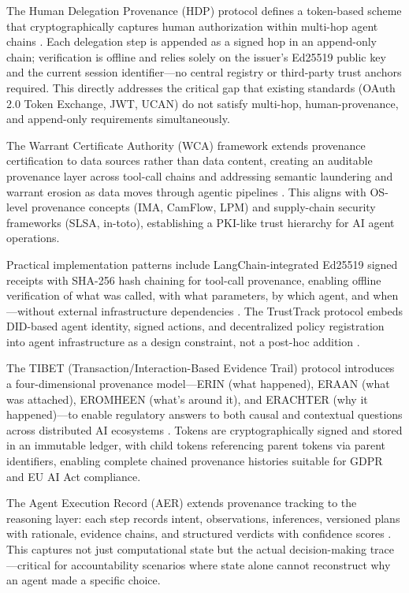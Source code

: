 The Human Delegation Provenance (HDP) protocol defines a token-based scheme that cryptographically captures human authorization within multi-hop agent chains \cite{hdp2026}. Each delegation step is appended as a signed hop in an append-only chain; verification is offline and relies solely on the issuer's Ed25519 public key and the current session identifier---no central registry or third-party trust anchors required. This directly addresses the critical gap that existing standards (OAuth 2.0 Token Exchange, JWT, UCAN) do not satisfy multi-hop, human-provenance, and append-only requirements simultaneously.

The Warrant Certificate Authority (WCA) framework extends provenance certification to data sources rather than data content, creating an auditable provenance layer across tool-call chains and addressing semantic laundering and warrant erosion as data moves through agentic pipelines \cite{wca2025}. This aligns with OS-level provenance concepts (IMA, CamFlow, LPM) and supply-chain security frameworks (SLSA, in-toto), establishing a PKI-like trust hierarchy for AI agent operations.

Practical implementation patterns include LangChain-integrated Ed25519 signed receipts with SHA-256 hash chaining for tool-call provenance, enabling offline verification of what was called, with what parameters, by which agent, and when---without external infrastructure dependencies \cite{langchainaudit2025}. The TrustTrack protocol embeds DID-based agent identity, signed actions, and decentralized policy registration into agent infrastructure as a design constraint, not a post-hoc addition \cite{trusttrack2025}.

The TIBET (Transaction/Interaction-Based Evidence Trail) protocol introduces a four-dimensional provenance model---ERIN (what happened), ERAAN (what was attached), EROMHEEN (what's around it), and ERACHTER (why it happened)---to enable regulatory answers to both causal and contextual questions across distributed AI ecosystems \cite{tibet2026}. Tokens are cryptographically signed and stored in an immutable ledger, with child tokens referencing parent tokens via parent identifiers, enabling complete chained provenance histories suitable for GDPR and EU AI Act compliance.

The Agent Execution Record (AER) extends provenance tracking to the reasoning layer: each step records intent, observations, inferences, versioned plans with rationale, evidence chains, and structured verdicts with confidence scores \cite{aer2025}. This captures not just computational state but the actual decision-making trace---critical for accountability scenarios where state alone cannot reconstruct why an agent made a specific choice.

